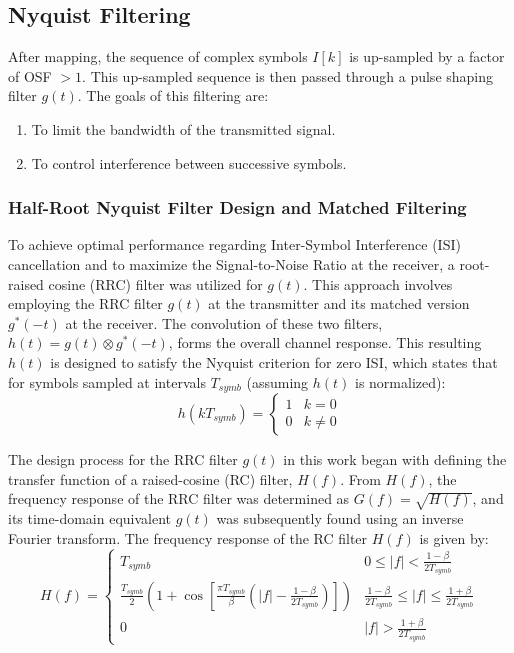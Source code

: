 \subsection{Nyquist Filtering}
After mapping, the sequence of complex symbols $I[k]$ is up-sampled by a factor of OSF $> 1$. This up-sampled sequence is then passed through a pulse shaping filter $g(t)$. The goals of this filtering are:
\begin{enumerate}
	\item To limit the bandwidth of the transmitted signal.
	\item To control interference between successive symbols.
\end{enumerate}

\subsubsection{Half-Root Nyquist Filter Design and Matched Filtering}
To achieve optimal performance regarding Inter-Symbol Interference (ISI) cancellation and to maximize the Signal-to-Noise Ratio at the receiver, a root-raised cosine (RRC) filter was utilized for $g(t)$. This approach involves employing the RRC filter $g(t)$ at the transmitter and its matched version $g^*(-t)$ at the receiver. The convolution of these two filters, $h(t) = g(t) \otimes g^*(-t)$, forms the overall channel response. This resulting $h(t)$ is designed to satisfy the Nyquist criterion for zero ISI, which states that for symbols sampled at intervals $T_{symb}$ (assuming $h(t)$ is normalized):
\begin{equation}
	h(kT_{symb}) = \begin{cases}
		1 & k=0 \\
		0 & k \neq 0
	\end{cases}
	\label{eq:nyquist_criterion_part1}
\end{equation}
\par
The design process for the RRC filter $g(t)$ in this work began with defining the transfer function of a raised-cosine (RC) filter, $H(f)$. From $H(f)$, the frequency response of the RRC filter was determined as $G(f) = \sqrt{H(f)}$, and its time-domain equivalent $g(t)$ was subsequently found using an inverse Fourier transform. The frequency response of the RC filter $H(f)$ is given by:
\begin{equation}
	H(f) = \begin{cases}
		T_{symb} & 0 \le |f| < \frac{1-\beta}{2T_{symb}} \\ 
		\frac{T_{symb}}{2} \left(1 + \cos\left[\frac{\pi T_{symb}}{\beta}\left(|f| - \frac{1-\beta}{2T_{symb}}\right)\right]\right) & \frac{1-\beta}{2T_{symb}} \le |f| \le \frac{1+\beta}{2T_{symb}} \\ 
		0 & |f| > \frac{1+\beta}{2T_{symb}}
	\end{cases}
	\label{eq:rc_response_part1}
\end{equation}

